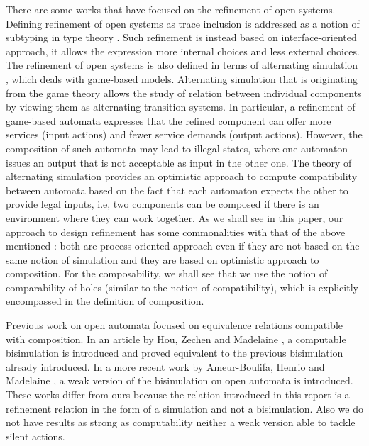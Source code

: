 \documentclass[runningheads]{llncs}
\begin{document}
There are some works that have focused on  the refinement of open systems. Defining refinement of open systems as trace inclusion  is  addressed  as a notion of subtyping in type theory 
\cite{GayH:2005,BravettiZ:2021}. Such refinement is  instead based  on interface-oriented approach, it allows the expression more internal choices and less external choices. The refinement of open systems is also defined in terms of  alternating simulation \cite{Alur:1998,deAlfaro:2021}, which deals with game-based models.
Alternating simulation that is originating from the game theory \cite{deAlfaro:2003} allows  the study of relation between individual components by viewing them as alternating transition systems. In particular,  a refinement of game-based automata expresses that the refined component can offer more services (input actions) and fewer service demands (output actions). However, the composition of such automata may
lead to illegal states, where one automaton issues an output that is not acceptable as input in the other one. The theory of alternating simulation provides an optimistic approach to compute compatibility between automata based on the fact that each automaton expects the other to provide  legal inputs, i.e, two components can be composed if there is an environment where they can work together. As we shall see in this paper, 
our approach to design refinement  has some commonalities with that of the above mentioned \cite{deAlfaro:2021}: both are process-oriented approach even if they are not based on the same notion of simulation and they are based on optimistic approach to composition. 
For the composability, we shall see that we use the notion of comparability of holes (similar to the notion of compatibility), which is explicitly encompassed in the definition of composition.

 



Previous work on open automata focused on equivalence relations compatible with composition.
In an article by Hou, Zechen and Madelaine \cite{10.1145/3372884.3373161}, a computable bisimulation is introduced and proved equivalent to the previous bisimulation already introduced.
In a more recent work by Ameur-Boulifa, Henrio and Madelaine \cite{fhbisim}, a weak version of the bisimulation on open automata is introduced.
These works differ from ours because the relation introduced in this report is a refinement relation in the form of a simulation and not a bisimulation.
Also we do not have results as strong as computability neither a weak version able to tackle silent actions.
\end{document}
